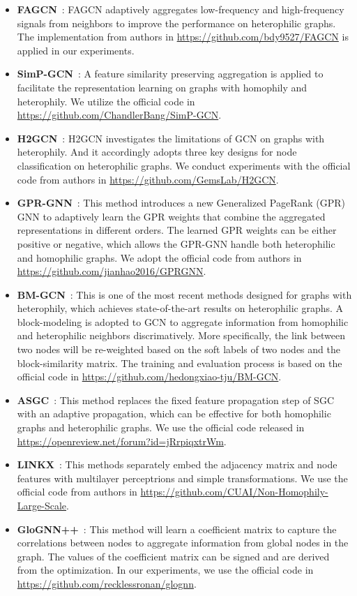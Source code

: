 \begin{itemize}[leftmargin=*]
    \item \textbf{FAGCN}~\cite{bo2021beyond}: FAGCN adaptively aggregates low-frequency and high-frequency signals from neighbors to improve the performance on heterophilic graphs. The implementation from authors in \url{https://github.com/bdy9527/FAGCN} is applied in our experiments.
    \item \textbf{SimP-GCN}~\cite{jin2021node}: A feature similarity preserving aggregation is applied to facilitate the representation learning on graphs with homophily and heterophily. We utilize the official code in \url{https://github.com/ChandlerBang/SimP-GCN}.
    \item \textbf{H2GCN}~\cite{zhu2020beyond}: H2GCN investigates the limitations of GCN on graphs with heterophily. And it accordingly adopts three key designs for node classification on heterophilic graphs. We conduct experiments with the official code from authors in \url{https://github.com/GemsLab/H2GCN}.
    \item \textbf{GPR-GNN}~\cite{chien2020adaptive}: This method introduces a new Generalized PageRank (GPR) GNN to adaptively learn the GPR weights that combine the aggregated representations in different orders. The learned GPR weights can be either positive or negative, which allows the GPR-GNN handle both heterophilic and homophilic graphs.  We adopt the official code from authors in \url{https://github.com/jianhao2016/GPRGNN}.
    \item \textbf{BM-GCN}~\cite{he2022block}: This is one of the most recent methods designed for graphs with heterophily, which achieves state-of-the-art results on heterophilic graphs.  A block-modeling is adopted to GCN to aggregate information from homophilic and heterophilic neighbors discrimatively. More specifically, the link between two nodes will be re-weighted based on  the soft labels of two nodes and the block-similarity matrix. The training and evaluation process is based on the official code in \url{https://github.com/hedongxiao-tju/BM-GCN}.
    \item \textbf{ASGC}~\cite{chanpuriya2022simplified}:  This method replaces the fixed feature propagation step of SGC~\cite{wu2019simplifying} with an adaptive propagation, which can be effective for both homophilic graphs and heterophilic graphs. We use the official code released in \url{https://openreview.net/forum?id=jRrpiqxtrWm}.
    \item \textbf{LINKX}~\cite{lim2021large}: This methods separately embed the adjacency matrix and node features with multilayer perceptrions and simple transformations. We use the official code from authors in \url{https://github.com/CUAI/Non-Homophily-Large-Scale}. 
    \item \textbf{GloGNN++}~\cite{li2022finding}: This method will learn a coefficient matrix to capture the correlations between nodes to aggregate information from global nodes in the graph. The values of the coefficient matrix can be signed and are derived from the optimization. In our experiments, we use the official code in \url{https://github.com/recklessronan/glognn}.
\end{itemize}

